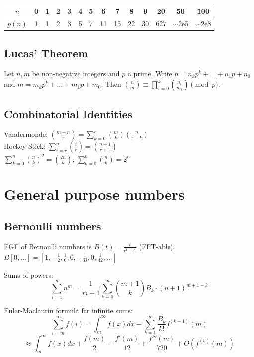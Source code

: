 		\begin{center}
		\begin{tabular}{c|c@{\ }c@{\ }c@{\ }c@{\ }c@{\ }c@{\ }c@{\ }c@{\ }c@{\ }c@{\ }c@{\ }c@{\ }c}
			$n$    & 0 & 1 & 2 & 3 & 4 & 5 & 6  & 7  & 8  & 9  & 20  & 50  & 100 \\ \hline
			$p(n)$ & 1 & 1 & 2 & 3 & 5 & 7 & 11 & 15 & 22 & 30 & 627 & $\mathtt{\sim}$2e5 & $\mathtt{\sim}$2e8 \\
		\end{tabular}
		\end{center}

	\subsection{Lucas' Theorem}
		Let $n,m$ be non-negative integers and $p$ a prime. Write $n=n_kp^k+...+n_1p+n_0$ and $m=m_kp^k+...+m_1p+m_0$. Then $\binom{n}{m} \equiv \prod_{i=0}^k\binom{n_i}{m_i} \pmod{p}$.


	\subsection{Combinatorial Identities}
		Vandermonde: $\binom{m+n}{r} = \sum_{k=0}^{r} \binom{m}{k}\binom{n}{r-k}$ \\
		Hockey Stick: $\sum_{i=r}^{n} \binom{i}{r} = \binom{n+1}{r+1}$ \\
		$\sum_{k=0}^{n} \binom{n}{k}^2 = \binom{2n}{n}$; $\sum_{k=0}^{n} \binom{n}{k} = 2^n$

\section{General purpose numbers}
	\subsection{Bernoulli numbers}
		EGF of Bernoulli numbers is $B(t)=\frac{t}{e^t-1}$ (FFT-able).
		$B[0,\ldots] = [1, -\frac{1}{2}, \frac{1}{6}, 0, -\frac{1}{30}, 0, \frac{1}{42}, \ldots]$

		Sums of powers:
		\small
		\[ \sum_{i=1}^n n^m = \frac{1}{m+1} \sum_{k=0}^m \binom{m+1}{k} B_k \cdot (n+1)^{m+1-k} \]
		\normalsize

		Euler-Maclaurin formula for infinite sums:
		\small
		\[ \sum_{i=m}^{\infty} f(i) = \int_m^\infty f(x) dx - \sum_{k=1}^\infty \frac{B_k}{k!}f^{(k-1)}(m) \]
		\[ \approx \int_{m}^\infty f(x)dx + \frac{f(m)}{2} - \frac{f'(m)}{12} + \frac{f'''(m)}{720} + O(f^{(5)}(m)) \]
		\normalsize

